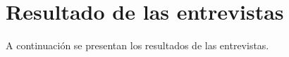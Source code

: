 \chapter{Resultado de las entrevistas} \label{Ap:resultados}

A continuación se presentan los resultados de las entrevistas.